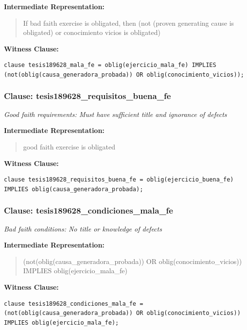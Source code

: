 \documentclass[11pt,a4paper]{article}
\begin{document}
\textbf{Intermediate Representation:}

\begin{quote}
If bad faith exercise is obligated, then (not (proven generating cause is obligated) or conocimiento vicios is obligated)
\end{quote}

\textbf{Witness Clause:}

\begin{lstlisting}[style=witnessstyle, language=Witness]
clause tesis189628_mala_fe = oblig(ejercicio_mala_fe) IMPLIES (not(oblig(causa_generadora_probada)) OR oblig(conocimiento_vicios));
\end{lstlisting}

\subsubsection{Clause: tesis189628\_requisitos\_buena\_fe}

\textit{Good faith requirements: Must have sufficient title and ignorance of defects}

\textbf{Intermediate Representation:}

\begin{quote}
good faith exercise is obligated
\end{quote}

\textbf{Witness Clause:}

\begin{lstlisting}[style=witnessstyle, language=Witness]
clause tesis189628_requisitos_buena_fe = oblig(ejercicio_buena_fe) IMPLIES oblig(causa_generadora_probada);
\end{lstlisting}

\subsubsection{Clause: tesis189628\_condiciones\_mala\_fe}

\textit{Bad faith conditions: No title or knowledge of defects}

\textbf{Intermediate Representation:}

\begin{quote}
(not(oblig(causa\_generadora\_probada)) OR oblig(conocimiento\_vicios)) IMPLIES oblig(ejercicio\_mala\_fe)
\end{quote}

\textbf{Witness Clause:}

\begin{lstlisting}[style=witnessstyle, language=Witness]
clause tesis189628_condiciones_mala_fe = (not(oblig(causa_generadora_probada)) OR oblig(conocimiento_vicios)) IMPLIES oblig(ejercicio_mala_fe);
\end{lstlisting}
\end{document}
